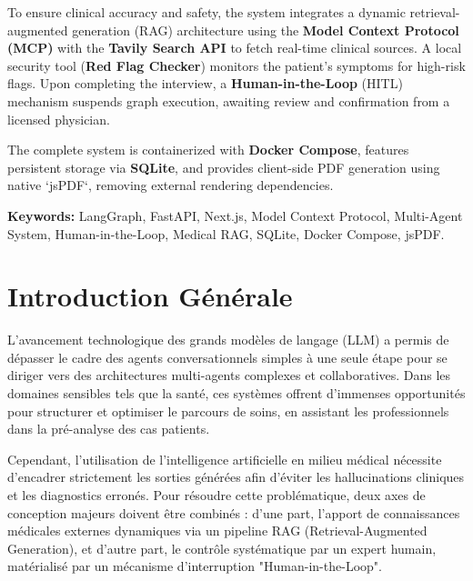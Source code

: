 \documentclass[11pt,a4paper]{report}
\begin{document}
To ensure clinical accuracy and safety, the system integrates a dynamic retrieval-augmented generation (RAG) architecture using the \textbf{Model Context Protocol (MCP)} with the \textbf{Tavily Search API} to fetch real-time clinical sources. A local security tool (\textbf{Red Flag Checker}) monitors the patient's symptoms for high-risk flags. Upon completing the interview, a \textbf{Human-in-the-Loop} (HITL) mechanism suspends graph execution, awaiting review and confirmation from a licensed physician.

The complete system is containerized with \textbf{Docker Compose}, features persistent storage via \textbf{SQLite}, and provides client-side PDF generation using native `jsPDF`, removing external rendering dependencies.

\vspace{0.5cm}
\textbf{Keywords:} LangGraph, FastAPI, Next.js, Model Context Protocol, Multi-Agent System, Human-in-the-Loop, Medical RAG, SQLite, Docker Compose, jsPDF.

\newpage
\tableofcontents
\newpage

\newpage
\section*{Introduction Générale}

L'avancement technologique des grands modèles de langage (LLM) a permis de dépasser le cadre des agents conversationnels simples à une seule étape pour se diriger vers des architectures multi-agents complexes et collaboratives. Dans les domaines sensibles tels que la santé, ces systèmes offrent d'immenses opportunités pour structurer et optimiser le parcours de soins, en assistant les professionnels dans la pré-analyse des cas patients.

Cependant, l'utilisation de l'intelligence artificielle en milieu médical nécessite d'encadrer strictement les sorties générées afin d'éviter les hallucinations cliniques et les diagnostics erronés. Pour résoudre cette problématique, deux axes de conception majeurs doivent être combinés : d'une part, l'apport de connaissances médicales externes dynamiques via un pipeline RAG (Retrieval-Augmented Generation), et d'autre part, le contrôle systématique par un expert humain, matérialisé par un mécanisme d'interruption "Human-in-the-Loop".
\end{document}
